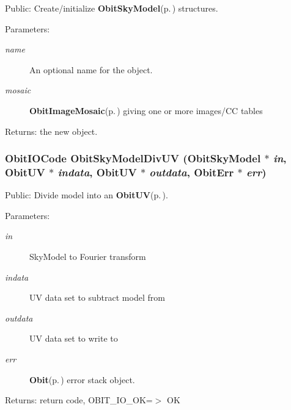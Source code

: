 Public: Create/initialize {\bf Obit\-Sky\-Model}{\rm (p.\,\pageref{structObitSkyModel})} structures. 

\begin{Desc}
\item[Parameters:]
\begin{description}
\item[{\em name}]An optional name for the object. \item[{\em mosaic}]{\bf Obit\-Image\-Mosaic}{\rm (p.\,\pageref{structObitImageMosaic})} giving one or more images/CC tables \end{description}
\end{Desc}
\begin{Desc}
\item[Returns:]the new object. \end{Desc}
\subsubsection{\setlength{\rightskip}{0pt plus 5cm}Obit\-IOCode Obit\-Sky\-Model\-Div\-UV ({\bf Obit\-Sky\-Model} $\ast$ {\em in}, {\bf Obit\-UV} $\ast$ {\em indata}, {\bf Obit\-UV} $\ast$ {\em outdata}, {\bf Obit\-Err} $\ast$ {\em err})}\label{ObitSkyModel_8c_a23}


Public: Divide model into an {\bf Obit\-UV}{\rm (p.\,\pageref{structObitUV})}. 

\begin{Desc}
\item[Parameters:]
\begin{description}
\item[{\em in}]Sky\-Model to Fourier transform \item[{\em indata}]UV data set to subtract model from \item[{\em outdata}]UV data set to write to \item[{\em err}]{\bf Obit}{\rm (p.\,\pageref{structObit})} error stack object. \end{description}
\end{Desc}
\begin{Desc}
\item[Returns:]return code, OBIT\_\-IO\_\-OK=$>$ OK \end{Desc}

